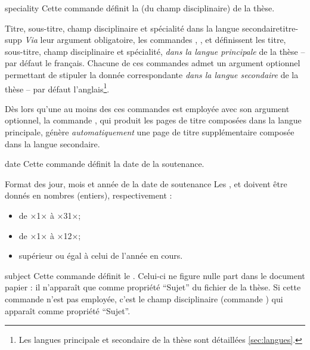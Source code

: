 %
\begin{docCommand}{speciality}{}
  Cette commande définit la  (du champ
  disciplinaire) de la thèse.
\end{docCommand}
%
\begin{dbremark}{Titre, sous-titre, champ disciplinaire et spécialité dans la
    langue secondaire}{titre-supp}
  \emph{Via} leur argument obligatoire, les commandes ,
  ,  et  définissent
  les titre, sous-titre, champ disciplinaire et spécialité, \emph{dans la
    langue principale} de la thèse -- par défaut le français. Chacune de ces
  commandes admet un argument optionnel permettant de stipuler la donnée
  correspondante \emph{dans la langue secondaire} de la thèse -- par défaut
  l'anglais\footnote{Les langues principale et secondaire de la thèse sont
    détaillées \vref{sec:langues}.}.

  Dès lors qu'une au moins des ces commandes est employée avec son argument
  optionnel, la commande , qui produit les pages de titre
  composées dans la langue principale, génère \emph{automatiquement} une page
  de titre supplémentaire composée dans la langue secondaire.
\end{dbremark}
%
\begin{docCommand}[doc description=\mandatory]{date}{}
  Cette commande définit la date de la soutenance.
  \begin{dbwarning}{Format des jour, mois et année de la date de
      soutenance}{}
    Les ,  et  doivent être donnés
    en nombres (entiers), respectivement :
    \begin{itemize}
    \item de ×1× à ×31×;
    \item de ×1× à ×12×;
    \item supérieur ou égal à celui de l'année en cours.
    \end{itemize}
  \end{dbwarning}
\end{docCommand}
%
\begin{docCommand}{subject}{}
  Cette commande définit le .  Celui-ci ne figure nulle
  part dans le document papier : il n'apparaît que comme propriété
  \enquote{Sujet} du fichier \pdf de la thèse. Si cette commande n'est pas
  employée, c'est le champ disciplinaire (commande ) qui
  apparaît comme propriété \enquote{Sujet}.
\end{docCommand}

